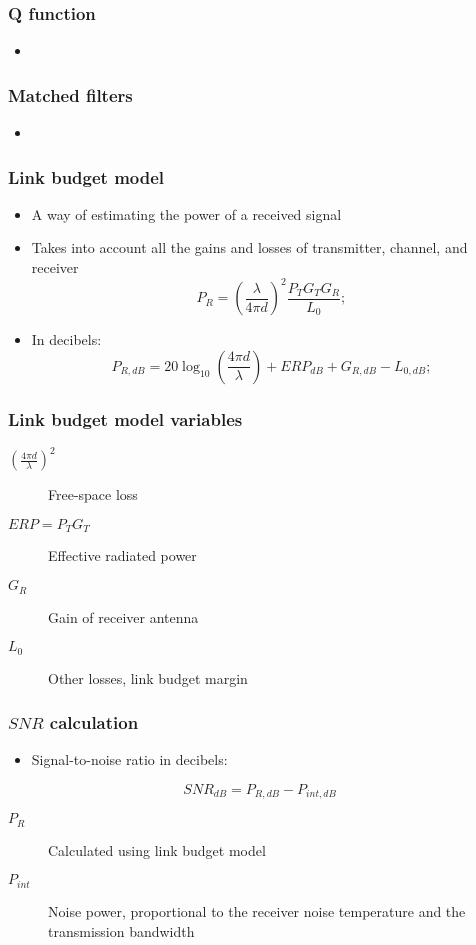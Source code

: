 \documentclass{beamer}
\begin{document}
\begin{frame}
	\frametitle{Q function}
	\begin{itemize}
		\item
	\end{itemize}
\end{frame}

\begin{frame}
	\frametitle{Matched filters}
	\begin{itemize}
		\item 
	\end{itemize}
\end{frame}

\begin{frame}
	\frametitle{Link budget model}
	\begin{itemize}
		\item A way of estimating the power of a received signal
		\item Takes into account all the gains and losses of transmitter, channel, and receiver
		\begin{equation}
			P_R = \left(\frac{\lambda}{4 \pi d}\right)^2 \frac{P_T G_T G_R}{L_0};
		\end{equation}
		\item In decibels:
		\begin{equation}
			P_{R, dB} = 20\log_{10}\left(\frac{4 \pi d}{\lambda}\right) + {ERP}_{dB} + G_{R, dB} - L_{0, dB};
		\end{equation}
	\end{itemize}
\end{frame}

\begin{frame}
	\frametitle{Link budget model variables}
	\begin{description}
		\item[$(\frac{4 \pi d}{\lambda})^2$] Free-space loss
		\item[$ERP = P_T G_T$] Effective radiated power
		\item[$G_R$] Gain of receiver antenna
		\item[$L_0$] Other losses, link budget margin
	\end{description}
\end{frame}

\begin{frame}
	\frametitle{$SNR$ calculation}
	\begin{itemize}
		\item Signal-to-noise ratio in decibels:
	\end{itemize}
	\begin{equation}
		{SNR}_{dB} = P_{R, dB} - P_{int, dB}
	\end{equation}
	\begin{description}
		\item[$P_R$] Calculated using link budget model
		\item[$P_{int}$] Noise power, proportional to the receiver noise temperature and the transmission bandwidth
	\end{description}
\end{frame}
\end{document}
